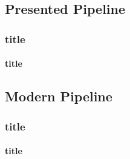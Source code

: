 \subsection{Presented Pipeline}
\begin{frame}
	\frametitle{title}
    \framesubtitle{title}
\end{frame}

\subsection{Modern Pipeline}
\begin{frame}
	\frametitle{title}
    \framesubtitle{title}
\end{frame}